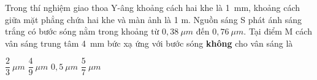 \begin{vidu}%
Trong thí nghiệm giao thoa Y-âng khoảng cách hai khe là 1\ mm, khoảng cách giữa mặt phẳng chứa hai khe và màn ảnh là 1 m. Nguồn sáng S phát ánh sáng trắng có bước sóng nằm trong khoảng từ $0,38\ \mu m$ đến $0,76\ \mu m$. Tại điểm M cách vân sáng trung tâm 4\ mm bức xạ ứng với bước sóng \textbf{không} cho vân sáng là

\choice
{$\dfrac{2}{3}\ \mu m$}
{ $\dfrac{4}{9}\ \mu m$}
{ $0,5\ \mu m$}
{ \True $\dfrac{5}{7}\ \mu m$}

\end{vidu} 


